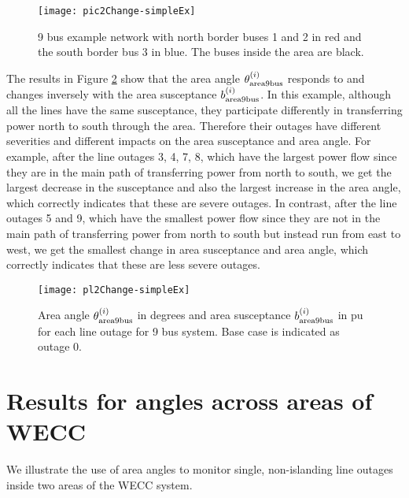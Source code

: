 \documentclass[conference]{IEEEtran}
\begin{document}
\begin{figure}[h]
\begin{center}
\texttt{[image: pic2Change-simpleEx]}
\caption{9 bus example network with north border buses 1 and 2  in red and the south border bus 3 in blue. The buses inside the area are black.}
\label{pic2Change-simpleEx.jpg}
\end{center}
\end{figure} 

The results in Figure \ref{pl2Change-simpleEx} show that the area  angle $\theta_{\rm area9bus}^{(i)}$ responds to and changes inversely with the area susceptance $b_{\rm area9bus}^{(i)}$. 
In this example, although all the lines have the same susceptance, they participate differently in transferring power north to south through the area.
Therefore their outages have different severities and different impacts on the area susceptance and area angle.
For example, 
after the line outages 3, 4, 7, 8, which have the largest power flow since they are in the main path of transferring power from  north to south, we get the largest decrease in the susceptance and also the largest increase in the area angle, which correctly indicates that these are severe outages. In contrast, after the line outages 5 and 9, which have the smallest power flow since they are not in the main path of transferring power from north to south but instead run from east to west, we get the smallest change in area susceptance and area angle,  which correctly indicates that these are less severe outages.

\begin{figure}[h]
\begin{center}
\texttt{[image: pl2Change-simpleEx]}
\caption{Area angle $\theta_{\rm area9bus}^{(i)}$ in degrees and  area susceptance $b_{\rm area9bus}^{(i)}$ in pu for each line outage for 9 bus system. Base case is indicated as outage 0.}
\label{pl2Change-simpleEx}
\end{center}
\end{figure} 


\section{Results for angles across areas of WECC}
\label{results}

We illustrate the use of area angles to monitor single, non-islanding line outages inside two areas of the  WECC system.
\end{document}
